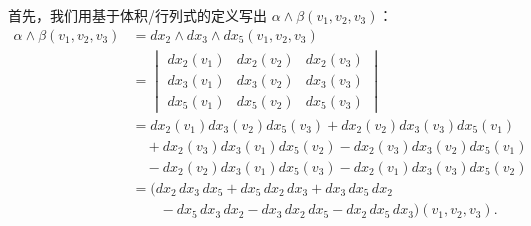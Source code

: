 首先，我们用基于体积/行列式的定义写出 $\alpha\wedge\beta(v_1,v_2,v_3)$：
\begin{align*}
\alpha\wedge\beta(v_1,v_2,v_3)
&=dx_2\wedge dx_3\wedge dx_5(v_1,v_2,v_3)\\
&=\begin{vmatrix}
dx_2(v_1) & dx_2(v_2) & dx_2(v_3)\\
dx_3(v_1) & dx_3(v_2) & dx_3(v_3)\\
dx_5(v_1) & dx_5(v_2) & dx_5(v_3)
\end{vmatrix}\\
&=dx_2(v_1)dx_3(v_2)dx_5(v_3)+dx_2(v_2)dx_3(v_3)dx_5(v_1)\\
&\quad+dx_2(v_3)dx_3(v_1)dx_5(v_2)-dx_2(v_3)dx_3(v_2)dx_5(v_1)\\
&\quad-dx_2(v_2)dx_3(v_1)dx_5(v_3)-dx_2(v_1)dx_3(v_3)dx_5(v_2)\\
&=\bigl(dx_2\,dx_3\,dx_5+dx_5\,dx_2\,dx_3+dx_3\,dx_5\,dx_2\\
&\qquad-dx_5\,dx_3\,dx_2-dx_3\,dx_2\,dx_5-dx_2\,dx_5\,dx_3\bigr)(v_1,v_2,v_3).
\end{align*}

